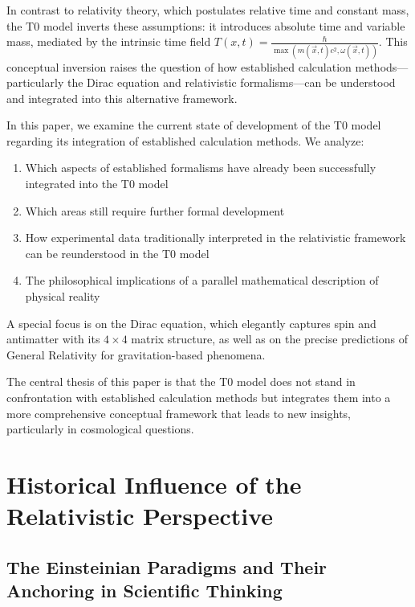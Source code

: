 \documentclass[12pt,a4paper]{article}
\newcommand{\Tfieldt}{T(x,t)}
\newcommand{\vecx}{\vec{x}}
\begin{document}
	In contrast to relativity theory, which postulates relative time and constant mass, the T0 model inverts these assumptions: it introduces absolute time and variable mass, mediated by the intrinsic time field $\Tfieldt = \frac{\hbar}{\max(m(\vecx,t)c^2, \omega(\vecx,t))}$. This conceptual inversion raises the question of how established calculation methods—particularly the Dirac equation and relativistic formalisms—can be understood and integrated into this alternative framework.
	
	In this paper, we examine the current state of development of the T0 model regarding its integration of established calculation methods. We analyze:
	
	\begin{enumerate}
		\item Which aspects of established formalisms have already been successfully integrated into the T0 model
		\item Which areas still require further formal development
		\item How experimental data traditionally interpreted in the relativistic framework can be reunderstood in the T0 model
		\item The philosophical implications of a parallel mathematical description of physical reality
	\end{enumerate}
	
	A special focus is on the Dirac equation, which elegantly captures spin and antimatter with its $4 \times 4$ matrix structure, as well as on the precise predictions of General Relativity for gravitation-based phenomena.
	
	The central thesis of this paper is that the T0 model does not stand in confrontation with established calculation methods but integrates them into a more comprehensive conceptual framework that leads to new insights, particularly in cosmological questions.
	
	\section{Historical Influence of the Relativistic Perspective}
	\label{sec:historical_bias}
	
	\subsection{The Einsteinian Paradigms and Their Anchoring in Scientific Thinking}
	\label{subsec:einstein_paradigms}
	
\end{document}
